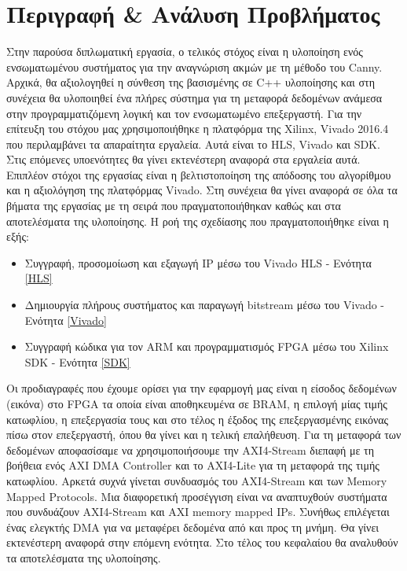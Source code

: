 \section{Περιγραφή \& Ανάλυση Προβλήματος}

Στην παρούσα διπλωματική εργασία, ο τελικός στόχος είναι η υλοποίηση ενός ενσωματωμένου συστήματος για την αναγνώριση ακμών με τη μέθοδο του Canny. Αρχικά, θα αξιολογηθεί η σύνθεση της βασισμένης σε C++ υλοποίησης και στη συνέχεια θα υλοποιηθεί ένα πλήρες σύστημα για τη μεταφορά δεδομένων ανάμεσα στην προγραμματιζόμενη λογική και τον ενσωματωμένο επεξεργαστή. Για την επίτευξη του στόχου μας χρησιμοποιήθηκε η πλατφόρμα της Xilinx, Vivado 2016.4 που περιλαμβάνει τα απαραίτητα εργαλεία. Αυτά είναι το HLS, Vivado και SDK. Στις επόμενες υποενότητες θα γίνει εκτενέστερη αναφορά στα εργαλεία αυτά. Επιπλέον στόχοι της εργασίας είναι η βελτιστοποίηση της απόδοσης του αλγορίθμου και η αξιολόγηση της πλατφόρμας Vivado. Στη συνέχεια θα γίνει αναφορά σε όλα τα βήματα της εργασίας με τη σειρά που πραγματοποιήθηκαν καθώς και στα αποτελέσματα της υλοποίησης.
Η ροή της σχεδίασης που πραγματοποιήθηκε είναι η εξής:
\begin{itemize}[leftmargin=*]
	\item{Συγγραφή, προσομοίωση και εξαγωγή IP μέσω του Vivado HLS} - Ενότητα \ref{HLS}
	\item{Δημιουργία πλήρους συστήματος και παραγωγή bitstream μέσω του Vivado} - Ενότητα \ref{Vivado}
	\item{Συγγραφή κώδικα για τον ARM και προγραμματισμός FPGA μέσω του Xilinx SDK} - Ενότητα \ref{SDK} \\
\end{itemize}

Οι προδιαγραφές που έχουμε ορίσει για την εφαρμογή μας είναι η είσοδος δεδομένων (εικόνα) στο FPGA τα οποία είναι αποθηκευμένα σε BRAM, η επιλογή μίας τιμής κατωφλίου, η επεξεργασία τους και στο τέλος η έξοδος της επεξεργασμένης εικόνας πίσω στον επεξεργαστή, όπου θα γίνει και η τελική επαλήθευση. Για τη μεταφορά των δεδομένων αποφασίσαμε να χρησιμοποιήσουμε την AXI4-Stream διεπαφή με τη βοήθεια ενός AXI DMA Controller και το AXI4-Lite για τη μεταφορά της τιμής κατωφλίου. Αρκετά συχνά γίνεται συνδυασμός του AXI4-Stream και των Memory Mapped Protocols. Μια διαφορετική προσέγγιση είναι να αναπτυχθούν συστήματα που συνδυάζουν AXI4-Stream και AXI memory mapped IPs. Συνήθως επιλέγεται ένας ελεγκτής DMA για να μεταφέρει δεδομένα από και προς τη μνήμη. Θα γίνει εκτενέστερη αναφορά στην επόμενη ενότητα. Στο τέλος του κεφαλαίου θα αναλυθούν τα αποτελέσματα της υλοποίησης.
